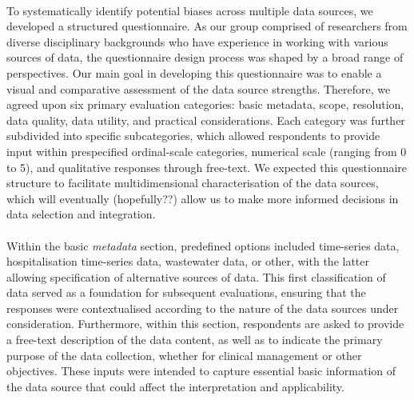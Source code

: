 \documentclass{article}
\begin{document}
\paragraph{}To systematically identify potential biases across multiple data sources, we developed a structured questionnaire. As our group comprised of researchers from diverse disciplinary backgrounds who have experience in working with various sources of data, the questionnaire design process was shaped by a broad range of perspectives. Our main goal in developing this questionnaire was to enable a visual and comparative assessment of the data source strengths. Therefore, we agreed upon six primary evaluation categories: basic metadata, scope, resolution, data quality, data utility, and practical considerations. Each category was further subdivided into specific subcategories, which allowed respondents to provide input within prespecified ordinal-scale categories, numerical scale (ranging from 0 to 5), and qualitative responses through free-text. We expected this questionnaire structure to facilitate multidimensional characterisation of the data sources, which will eventually (hopefully??)  allow us to make more informed decisions in data selection and integration. 

\paragraph{}Within the basic \textit{metadata} section, predefined options included time-series data, hospitalisation time-series data, wastewater data, or other, with the latter allowing specification of alternative sources of data. This first classification of data served as a foundation for subsequent evaluations, ensuring that the responses were contextualised according to the nature of the data sources under consideration. Furthermore, within this section, respondents are asked to provide a free-text description of the data content, as well as to indicate the primary purpose of the data collection, whether for clinical management or other objectives. These inputs were intended to capture essential basic information of the data source that could affect the interpretation and applicability. 
\end{document}
